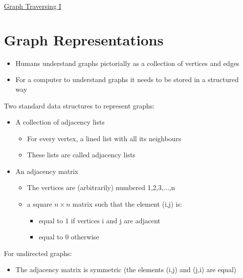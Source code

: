 \documentclass{article}[18pt]
\begin{document}
\begin{center}
\underline{\huge Graph Traversing I}
\end{center}
\section{Graph Representations}
\begin{itemize}
	\item Humans understand graphs pictorially as a collection of vertices and edges
	\item For a computer to understand graphs it needs to be stored in a structured way
\end{itemize}
Two standard data structures to represent graphs:
\begin{itemize}
	\item A collection of adjacency lists
	\begin{itemize}
		\item For every vertex, a lined list with all its neighbours
		\item These lists are called adjacency lists
	\end{itemize}
	\item An adjacency matrix
	\begin{itemize}
		\item The vertices are (arbitrarily) numbered 1,2,3,...,n
		\item a square $n\times n$ matrix such that the element (i,j) is:
		\begin{itemize}
			\item equal to 1 if vertices i and j are adjacent
			\item equal to 0 otherwise
		\end{itemize}
	\end{itemize}
\end{itemize}
For undirected graphs:
\begin{itemize}
	\item The adjacency matrix is symmetric (the elements (i,j) and (j,i) are equal)
\end{itemize}
\end{document}
